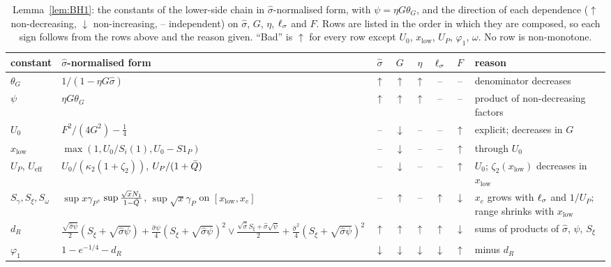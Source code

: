 \begin{table}
\caption{Lemma~\ref{lem:BH1}: the constants of the lower-side chain in $\hat\sigma$-normalised form, with $\psi=\eta G\theta_G$, and the direction of each
dependence ($\uparrow$ non-decreasing, $\downarrow$ non-increasing, -- independent) on $\hat\sigma$, $G$, $\eta$, $\ell_\sigma$ and $F$. Rows are listed in the order in
which they are composed, so each sign follows from the rows above and the reason given. ``Bad'' is $\uparrow$ for every row except $U_0$, $x_{\mathrm{low}}$,
$U_P$, $\varphi_1$, $\omega$. No row is non-monotone.}
\label{tab:mono}
\begin{ruledtabular}
\small
\begin{tabular}{p{}p{}ccccc p{}}
constant & $\hat\sigma$-normalised form & $\hat\sigma$ & $G$ & $\eta$ & $\ell_\sigma$ & $F$ & reason\\ \hline
$\theta_G$ & $1/(1-\eta G\hat\sigma)$ & $\uparrow$ & $\uparrow$ & $\uparrow$ & -- & -- & denominator decreases\\
$\psi$ & $\eta G\theta_G$ & $\uparrow$ & $\uparrow$ & $\uparrow$ & -- & -- & product of non-decreasing factors\\
$U_0$ & $F^2/(4G^2)-\tfrac14$ & -- & $\downarrow$ & -- & -- & $\uparrow$ & explicit; decreases in $G$\\
$x_{\mathrm{low}}$ & $\max(1,U_0/S_i(1),U_0-S1_P)$ & -- & $\downarrow$ & -- & -- & $\uparrow$ & through $U_0$\\
$U_P$, $U_{\mathrm{eff}}$ & $U_0/(\kappa_2(1+\zeta_2))$, $U_P/(1+\bar Q)$ & -- & $\downarrow$ & -- & -- & $\uparrow$ & $U_0$; $\zeta_2(x_{\mathrm{low}})$ decreases in $x_{\mathrm{low}}$\\
$S_\gamma,S_\xi,S_\omega$ & $\sup x\gamma_P$, $\sup\frac{\sqrt xN_1}{1-\bar Q}$, $\sup\sqrt x\gamma_P$ on $[x_{\mathrm{low}},x_e]$ & -- & $\uparrow$ & -- & $\uparrow$ & $\downarrow$ & $x_e$ grows with $\ell_\sigma$ and $1/U_P$; range shrinks with $x_{\mathrm{low}}$\\
$d_R$ & $\frac{\sqrt{\hat\sigma\psi}}2(S_\xi+\sqrt{\hat\sigma\psi})+\frac{\hat\sigma\psi}4(S_\xi+\sqrt{\hat\sigma\psi})^2\vee\frac{\sqrt{\hat\sigma}S_\xi+\hat\sigma\sqrt\psi}2+\frac{\hat\sigma^2}4(S_\xi+\sqrt{\hat\sigma\psi})^2$ & $\uparrow$ & $\uparrow$ & $\uparrow$ & $\uparrow$ & $\downarrow$ & sums of products of $\hat\sigma$, $\psi$, $S_\xi$\\
$\varphi_1$ & $1-e^{-1/4}-d_R$ & $\downarrow$ & $\downarrow$ & $\downarrow$ & $\downarrow$ & $\uparrow$ & minus $d_R$\\

\end{tabular}
\end{ruledtabular}
\end{table}
